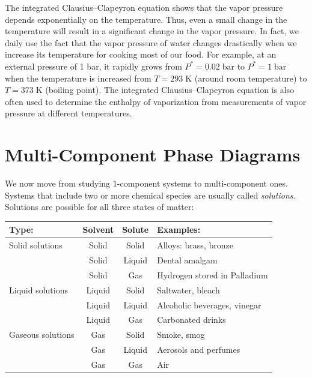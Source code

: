 \documentclass[
  9pt,
]{extbook}
\theoremstyle{definition}
\theoremstyle{definition}
\theoremstyle{definition}
\theoremstyle{remark}
\begin{document}
The integrated Clausius--Clapeyron equation shows that the vapor pressure depends exponentially on the temperature. Thus, even a small change in the temperature will result in a significant change in the vapor pressure. In fact, we daily use the fact that the vapor pressure of water changes drastically when we increase its temperature for cooking most of our food. For example, at an external pressure of 1 bar, it rapidly grows from \(P^*=0.02\;\text{bar}\) to \(P^*=1\;\text{bar}\) when the temperature is increased from \(T=293\;\mathrm{K}\) (around room temperature) to \(T=373\;\mathrm{K}\) (boiling point). The integrated Clausius--Clapeyron equation is also often used to determine the enthalpy of vaporization from measurements of vapor pressure at different temperatures.

\hypertarget{MCPhaseDiagrams}{%
\chapter{Multi-Component Phase Diagrams}\label{MCPhaseDiagrams}}

We now move from studying 1-component systems to multi-component ones. Systems that include two or more chemical species are usually called \emph{solutions}. Solutions are possible for all three states of matter:

\scriptsize

\begin{longtable}[]{@{}lccl@{}}
\toprule
Type: & Solvent & Solute & Examples:\tabularnewline
\midrule
\endhead
Solid solutions & Solid & Solid & Alloys: brass, bronze\tabularnewline
& Solid & Liquid & Dental amalgam\tabularnewline
& Solid & Gas & Hydrogen stored in Palladium\tabularnewline
Liquid solutions & Liquid & Solid & Saltwater, bleach\tabularnewline
& Liquid & Liquid & Alcoholic beverages, vinegar\tabularnewline
& Liquid & Gas & Carbonated drinks\tabularnewline
Gaseous solutions & Gas & Solid & Smoke, smog\tabularnewline
& Gas & Liquid & Aerosols and perfumes\tabularnewline
& Gas & Gas & Air\tabularnewline
\bottomrule
\end{longtable}

\normalsize
\end{document}
